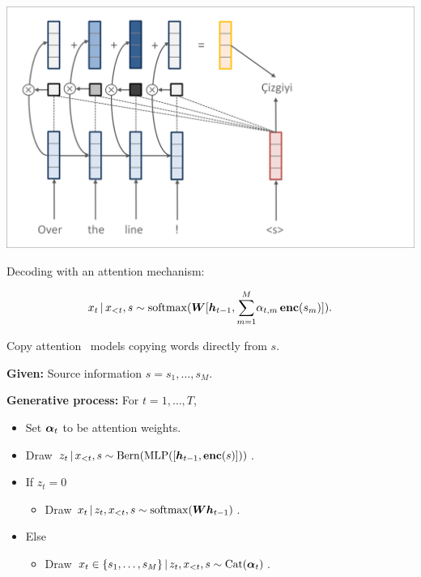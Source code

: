 \begin{frame}
\begin{center}
    \includegraphics[scale=0.24]{pics/attn1step.png}
\end{center}

Decoding with an attention mechanism:

\[x_{t} \,|\, x_{< t}, s  \sim \operatorname*{softmax}(\boldsymbol{W} [\boldsymbol{h}_{t-1}, {\sum_{m=1}^M} \alpha_{t,m} \,  \boldsymbol{\mathrm{enc}}(s_m)]).\]



\end{frame}

\begin{frame}
Copy attention~\citep{gu2016incorporating,gulcehre2016pointing} models copying words directly from $s$.
\air

\textbf{Given:} Source information $s = s_1, \ldots, s_M$.
\air

\textbf{Generative process:} For $t=1, \ldots, T$,
\begin{itemize}
    \item Set $\boldsymbol{\alpha}_t$ to be attention weights.
    \item Draw $z_{t} \,|\, x_{< t}, s \sim \mathrm{Bern}(\operatorname*{MLP}([\boldsymbol{h}_{t-1}, \boldsymbol{\mathrm{enc}}(s)]))$.
    \item If $z_{t} = 0$
    \begin{itemize}
        \item Draw $x_{t} \,|\, z_{t}, x_{< t}, s \sim \operatorname*{softmax}(\boldsymbol{W} \boldsymbol{h}_{t-1})$.
    \end{itemize}
    \item Else 
    \begin{itemize}
        \item Draw $x_{t} \in \{s_1, \ldots, s_M\} \,|\, z_{t}, x_{< t}, s \sim \mathrm{Cat}(\boldsymbol{\alpha}_t)$.

    \end{itemize}
    \end{itemize}

\end{frame}

